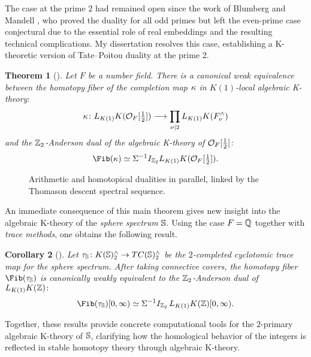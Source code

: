 \documentclass[11pt]{article}
\newtheorem{theorem}{Theorem}
\newtheorem{corollary}[theorem]{Corollary}
\begin{document}
The case at the prime $2$ had remained open since the work of Blumberg and Mandell \cite{MR4121155}, who proved the duality for all odd primes but left the even-prime case conjectural due to the essential role of real embeddings and the resulting technical complications.
My dissertation resolves this case, establishing a K-theoretic version of Tate–Poitou duality at the prime $2$.

\begin{theorem}[\cite{Cho}]
Let $F$ be a number field.
There is a canonical weak equivalence between  the {\it homotopy fiber of the completion map} $\kappa$ in $K(1)$-local algebraic K-theory$\colon$
\[\kappa\colon L_{K(1)}K({\mathcal{O}}_F[\tfrac{1}{2}]) \longrightarrow \prod_{\nu \mid 2} L_{K(1)}K(F_\nu^\wedge)\]
and the $\mathbb{Z}_2$-Anderson dual of the algebraic K-theory of ${\mathcal{O}}_F[\tfrac{1}{2}]\colon$
 \begin{equation}\label{fib}
 \Fib(\ka) \simeq \SI^{-1} I_{\bZ_2} L_{K(1)}K(\calO_F[\tfrac{1}{2}]).
\end{equation}
\end{theorem}

\begin{figure}[h]
\centering
{}
\captionsetup{font=footnotesize, skip=0em}
\caption{
Arithmetic and homotopical dualities in parallel,
linked by the Thomason descent spectral sequence.
}
\end{figure}

An immediate consequence of this main theorem gives new insight into the algebraic K-theory of the {\it sphere spectrum} $\mathbb{S}$.
Using the case $F=\mathbb{Q}$ together with {\it trace methods}, one obtains the following result.

\begin{corollary}[\cite{Cho}]
Let $\tau_{\mathbb{S}}\colon K(\mathbb{S})_2^\wedge \to TC(\mathbb{S})_2^\wedge$ be the $2$-completed cyclotomic trace map for the sphere spectrum.
After taking connective covers, the homotopy fiber $\Fib(\ta_\bS)$ is canonically weakly equivalent to the $\mathbb{Z}_2$-Anderson dual of $L_{K(1)}K(\mathbb{Z})\colon$
\[\Fib(\ta_\bS)[0,\infty) \simeq \Sigma^{-1} I_{\bZ_2}\, L_{K(1)}K(\bZ)[0,\infty).\]
\end{corollary}
Together, these results provide concrete computational tools for the $2$-primary algebraic K-theory of $\mathbb{S}$, clarifying how the homological behavior of the integers is reflected in stable homotopy theory through algebraic K-theory.
\end{document}
